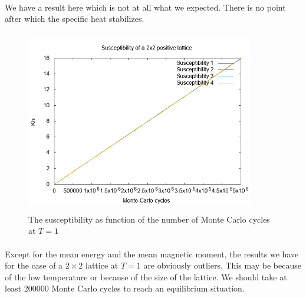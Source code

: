 \documentclass[a4paper, twoside, 11pt]{report}
\theoremstyle{theorem}
\theoremstyle{remark}
\theoremstyle{exemple}
\begin{document}
            \paragraph{}We have a result here which is not at all what we expected. There is no point after which the specific heat stabilizes. 
            
                \begin{center}
                \begin{figure}[h!]
                    \centering
                    \includegraphics[width=10cm,height=8cm]{Results/B/T=1/Plots/Khi}
                    \caption{The susceptibility as function of the number of Monte Carlo cycles at $T=1$}
                \end{figure}
                \end{center}
                
            \paragraph{}Except for the mean energy and the mean magnetic moment, the results we have for the case of a $2 \times 2$ lattice at $T=1$ are obviously outliers. This may be because of the low temperature or because of the size of the lattice. We should take at least 200000 Monte Carlo cycles to reach an equilibrium situation.
            
\end{document}
